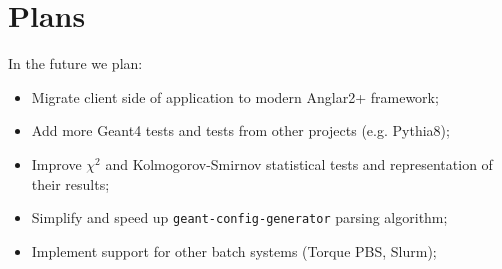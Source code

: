 \section{Plans}
\label{sec-plans}

In the future we plan:
\begin{itemize}
	\item Migrate client side of application to modern Anglar2+ framework;
	\item Add more Geant4 tests and tests from other projects (e.g. Pythia8);
	\item Improve $\chi^2$ and Kolmogorov-Smirnov statistical tests and representation of their results;
	\item Simplify and speed up {\tt geant-config-generator} parsing algorithm;
	\item Implement support for other batch systems (Torque PBS, Slurm);
\end{itemize}
